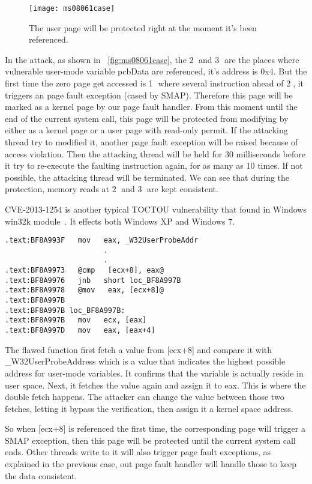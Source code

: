 \begin{figure}[th]
  \texttt{[image: ms08061case]}
  \centering
  \caption{The user page will be protected right at the moment it's been referenced.}
  \label{fig:ms08061case}
\end{figure}

In the attack, as shown in ~\autoref{fig:ms08061case}, the \textcircled{2} and \textcircled{3} are the places where vulnerable user-mode variable pcbData are referenced, it's address is 0x4. But the first time the zero page get accessed is \textcircled{1} where several instruction ahead of \textcircled{2}, it triggers an page fault exception (cased by SMAP). Therefore this page will be marked as a kernel page by our page fault handler. From this moment until the end of the current system call, this page will be protected from modifying by either as a kernel page or a user page with read-only permit. If the attacking thread try to modified it, another page fault exception  will be raised because of access violation. Then the attacking thread will be held for 30 milliseconds before it try to re-execute the faulting instruction again, for as many as 10 times. If not possible, the attacking thread will be terminated. We can see that during the protection, memory reads at \textcircled{2} and \textcircled{3} are kept consistent.


CVE-2013-1254 is another typical TOCTOU vulnerability that found in Windows win32k module~\cite{jurczyk2013identifying}. It effects both Windows XP and Windows 7. 


\begin{lstlisting}[basicstyle=\small,style=base] 
.text:BF8A993F   mov   eax, _W32UserProbeAddr
                       .
                       .
.text:BF8A9973   @cmp   [ecx+8], eax@    
.text:BF8A9976   jnb   short loc_BF8A997B
.text:BF8A9978   @mov   eax, [ecx+8]@    
.text:BF8A997B
.text:BF8A997B loc_BF8A997B:                           
.text:BF8A997B   mov   ecx, [eax]
.text:BF8A997D   mov   eax, [eax+4]
\end{lstlisting}

The flawed function first fetch a value from [ecx+8] and compare it with _W32UserProbeAddress which is a value that indicates the highest possible address for user-mode variables. It confirms that the variable is actually reside in user space. Next, it fetches the value again and assign it to eax. This is where the double fetch happens. The attacker can change the value between those two fetches, letting it bypass the verification,  then assign it a kernel space address.

So when [ecx+8] is referenced the first time, the corresponding page will trigger a SMAP exception, then this page will be protected until the current system call ends. Other threads write to it will also trigger page fault exceptions, as explained in the previous case, out page fault handler will handle those to keep the data consistent. 


